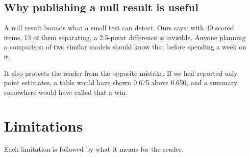 \documentclass[11pt,a4paper]{article}
\begin{document}
\subsection{Why publishing a null result is useful}

A null result bounds what a small test can detect. Ours says: with 40 scored items, 13 of them separating, a 2.5-point difference is invisible. Anyone planning a comparison of two similar models should know that before spending a week on it.

It also protects the reader from the opposite mistake. If we had reported only point estimates, a table would have shown 0.675 above 0.650, and a summary somewhere would have called that a win.

\section{Limitations}
\label{sec:limits}

Each limitation is followed by what it means for the reader.
\end{document}
